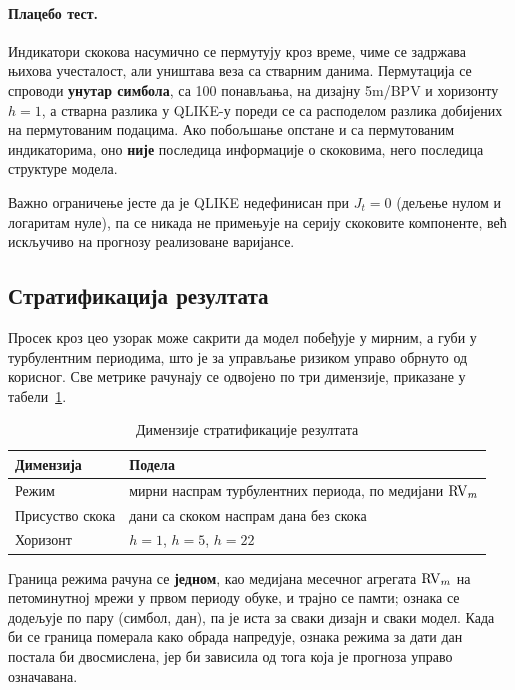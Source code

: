 \paragraph{Плацебо тест.}
Индикатори скокова насумично се пермутују кроз време, чиме се задржава њихова
учесталост, али уништава веза са стварним данима. Пермутација се спроводи
\textbf{унутар симбола}, са 100 понављања, на дизајну 5m/BPV и хоризонту $h = 1$, а
стварна разлика у QLIKE-у пореди се са расподелом разлика добијених на пермутованим
подацима. Ако побољшање опстане и са пермутованим индикаторима, оно \textbf{није}
последица информације о скоковима, него последица структуре модела.

Важно ограничење јесте да је QLIKE недефинисан при $J_t = 0$ (дељење нулом и логаритам
нуле), па се никада не примењује на серију скоковите компоненте, већ искључиво на
прогнозу реализоване варијансе.

\subsection{Стратификација резултата}
\label{subsec:stratifikacija}

Просек кроз цео узорак може сакрити да модел побеђује у мирним, а губи у турбулентним
периодима, што је за управљање ризиком управо обрнуто од корисног. Све метрике рачунају
се одвојено по три димензије, приказане у табели~\ref{tab:stratifikacija}.

\begin{table}[htbp]
\centering
\caption{Димензије стратификације резултата}
\label{tab:stratifikacija}
\begin{tabular}{ll}
\toprule
Димензија & Подела \\
\midrule
Режим            & мирни наспрам турбулентних периода, по медијани $\mathrm{RV}_m$ \\
Присуство скока  & дани са скоком наспрам дана без скока \\
Хоризонт         & $h = 1$, $h = 5$, $h = 22$ \\
\bottomrule
\end{tabular}
\end{table}

Граница режима рачуна се \textbf{једном}, као медијана месечног агрегата $\mathrm{RV}_m$ на
петоминутној мрежи у првом периоду обуке, и трајно се памти; ознака се додељује по пару
(симбол, дан), па је иста за сваки дизајн и сваки модел. Када би се граница померала
како обрада напредује, ознака режима за дати дан постала би двосмислена, јер би зависила
од тога која је прогноза управо означавана.

